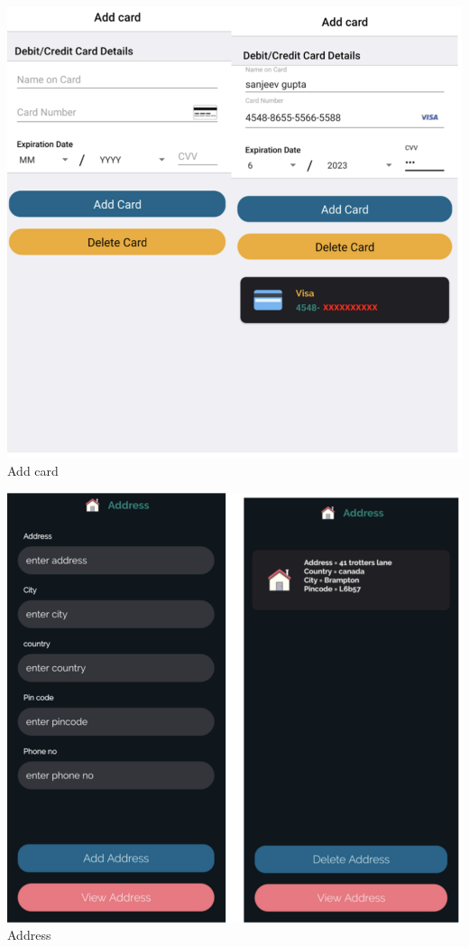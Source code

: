 \begin{center}
\includegraphics[scale=0.55]{card.png}\\[0.75cm]
\caption{Add card}
\end{center}
\begin{center}
\includegraphics[scale=0.55]{add.png}\\[0.75cm]
\caption{Address}
\end{center}
